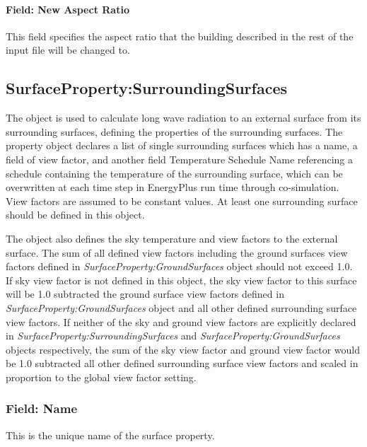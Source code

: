 \paragraph{Field: New Aspect Ratio}\label{field-new-aspect-ratio}

This field specifies the aspect ratio that the building described in the rest of the input file will be changed to.

\subsection{SurfaceProperty:SurroundingSurfaces}\label{surfacePropertySurroundingSurfaces}

The object is used to calculate long wave radiation to an external surface from its surrounding surfaces, defining the properties of the surrounding surfaces. The property object declares a list of single surrounding surfaces which has a name, a field of view factor, and another field Temperature Schedule Name referencing a schedule containing the temperature of the surrounding surface, which can be overwritten at each time step in EnergyPlus run time through co-simulation. View factors are assumed to be constant values. At least one surrounding surface should be defined in this object.

The object also defines the sky temperature and view factors to the external surface. The sum of all defined view factors including the ground surfaces view factors defined in \textit{SurfaceProperty:GroundSurfaces} object should not exceed 1.0. If sky view factor is not defined in this object, the sky view factor to this surface will be 1.0 subtracted the ground surface view factors defined in \textit{SurfaceProperty:GroundSurfaces} object and all other defined surrounding surface view factors. If neither of the sky and ground view factors are explicitly declared in \textit{SurfaceProperty:SurroundingSurfaces} and \textit{SurfaceProperty:GroundSurfaces} objects respectively, the sum of the sky view factor and ground view factor would be 1.0 subtracted all other defined surrounding surface view factors and scaled in proportion to the global view factor setting. 

\subsubsection{Field: Name}\label{field-srd-surfs-name}

This is the unique name of the surface property.

